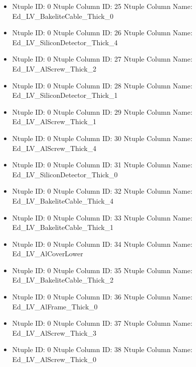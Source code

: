 \documentclass[8pt]{beamer}
\begin{document}
\begin{frame}
\begin{itemize}
        \item Ntuple ID: 0 Ntuple Column ID: 25 Ntuple Column Name: Ed\_LV\_BakeliteCable\_Thick\_0
        
        \item Ntuple ID: 0 Ntuple Column ID: 26 Ntuple Column Name: Ed\_LV\_SiliconDetector\_Thick\_4
        
        \item Ntuple ID: 0 Ntuple Column ID: 27 Ntuple Column Name: Ed\_LV\_AlScrew\_Thick\_2
        
        \item Ntuple ID: 0 Ntuple Column ID: 28 Ntuple Column Name: Ed\_LV\_SiliconDetector\_Thick\_1
        
        \item Ntuple ID: 0 Ntuple Column ID: 29 Ntuple Column Name: Ed\_LV\_AlScrew\_Thick\_1
        
        \item Ntuple ID: 0 Ntuple Column ID: 30 Ntuple Column Name: Ed\_LV\_AlScrew\_Thick\_4
        
        \item Ntuple ID: 0 Ntuple Column ID: 31 Ntuple Column Name: Ed\_LV\_SiliconDetector\_Thick\_0
        
        \item Ntuple ID: 0 Ntuple Column ID: 32 Ntuple Column Name: Ed\_LV\_BakeliteCable\_Thick\_4
        
        \item Ntuple ID: 0 Ntuple Column ID: 33 Ntuple Column Name: Ed\_LV\_BakeliteCable\_Thick\_1
        
        \item Ntuple ID: 0 Ntuple Column ID: 34 Ntuple Column Name: Ed\_LV\_AlCoverLower
        
        \item Ntuple ID: 0 Ntuple Column ID: 35 Ntuple Column Name: Ed\_LV\_BakeliteCable\_Thick\_2
        
        \item Ntuple ID: 0 Ntuple Column ID: 36 Ntuple Column Name: Ed\_LV\_AlFrame\_Thick\_0
        
        \item Ntuple ID: 0 Ntuple Column ID: 37 Ntuple Column Name: Ed\_LV\_AlScrew\_Thick\_3
        
        \item Ntuple ID: 0 Ntuple Column ID: 38 Ntuple Column Name: Ed\_LV\_AlScrew\_Thick\_0
        

\end{itemize}
\end{frame}
\end{document}
